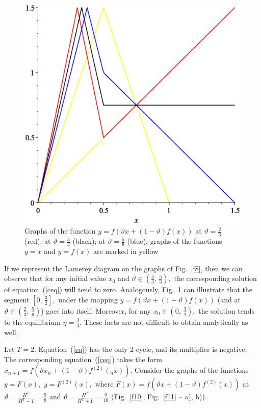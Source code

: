 \documentclass[12pt,a4paper]{amsart}
\begin{document}
\begin{figure}[h!]
\centering
\includegraphics[scale=0.28]{Fig9}
\caption{Graphs of the function $y = f \left( \vartheta x + (1 - \vartheta)f(x) \right)$ at $\vartheta=\frac23$ (red);
at $\vartheta=\frac34$ (black); at $\vartheta=\frac56$ (blue); graphs of the functions $y=x$ and $y=f(x)$ 
are marked in yellow} \label{f9}
\end{figure}

If we represent the Lamerey diagram on the graphs of Fig.~\ref{f8}, then we can observe that for any initial value $x_0$ 
and $\vartheta \in \left(\frac43,\,\frac53\right),$ the corresponding solution of equation~(\ref{ceq}) will tend to zero. 
Analogously, Fig.~\ref{f9} can illustrate that the segment $\left[ 0,\,\frac32\right],$ under the mapping  
$y = f \left( \vartheta x + (1 - \vartheta)f(x) \right)$ (and at $\vartheta \in \left(\frac23,\,\frac56\right)$) goes into itself.
Moreover, for any $x_0 \in \left(0,\,\frac32\right),$ the solution tends to the equilibrium $\eta = \frac34.$ These facts are 
not difficult to obtain analytically as well.

Let $T=2.$ Equation~(\ref{eq}) has the only 2-cycle, and its multiplier is negative. The corresponding equation~(\ref{ceq}) 
takes the form $x_{n+1} = f \left( \vartheta x_n + (1 - \vartheta)f^{(2)}(_nx) \right).$ Consider the graphs of the functions 
$y=F(x),$ $y=F^{(2)}(x),$ where $F(x) = f \left( \vartheta x + (1 - \vartheta)f^{(2)}(x) \right)$ at 
$\vartheta = \frac{H^T}{H^T-1} = \frac98$ and $\vartheta = \frac{H^T}{H^T+1} = \frac{9}{10}$ 
(Fig.~\ref{f10}, Fig.~\ref{f11} -- a), b)).
\end{document}
